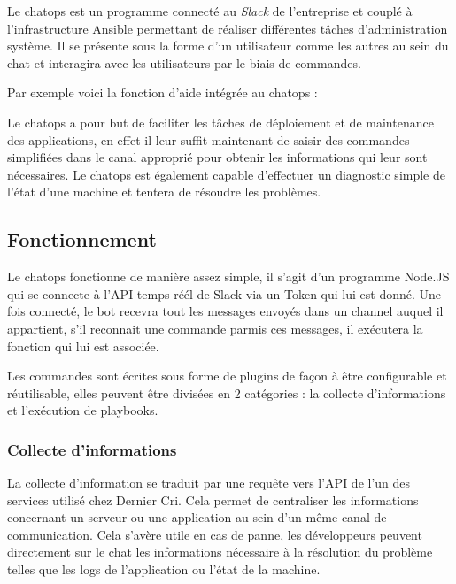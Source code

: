 \documentclass[12pt,a4paper]{article}
\begin{document}
  Le chatops est un programme connecté au \emph{Slack} de l'entreprise et
  couplé à l'infrastructure Ansible permettant de réaliser différentes
  tâches d'administration système. Il se présente sous la forme d'un
  utilisateur comme les autres au sein du chat et interagira avec les
  utilisateurs par le biais de commandes.

  \bigskip

  Par exemple voici la fonction d'aide intégrée au chatops :

  \bigskip

  Le chatops a pour but de faciliter les tâches de déploiement et de
  maintenance des applications, en effet il leur suffit maintenant de
  saisir des commandes simplifiées dans le canal approprié pour obtenir
  les informations qui leur sont nécessaires. Le chatops est également
  capable d'effectuer un diagnostic simple de l'état d'une machine et
  tentera de résoudre les problèmes.

  \newpage

  \subsection{Fonctionnement}\label{fonctionnement}

  Le chatops fonctionne de manière assez simple, il s'agit d'un programme
  Node.JS qui se connecte à l'API temps réél de Slack via un Token qui lui
  est donné. Une fois connecté, le bot recevra tout les messages envoyés
  dans un channel auquel il appartient, s'il reconnait une commande parmis
  ces messages, il exécutera la fonction qui lui est associée.

  \bigskip

  Les commandes sont écrites sous forme de plugins de façon à être
  configurable et réutilisable, elles peuvent être divisées en 2
  catégories : la collecte d'informations et l'exécution de playbooks.

  \newpage

  \subsubsection{Collecte d'informations}\label{collecte-dinformations}

  La collecte d'information se traduit par une requête vers l'API de l'un
  des services utilisé chez Dernier Cri. Cela permet de centraliser les
  informations concernant un serveur ou une application au sein d'un même
  canal de communication. Cela s'avère utile en cas de panne, les
  développeurs peuvent directement sur le chat les informations nécessaire
  à la résolution du problème telles que les logs de l'application ou
  l'état de la machine.
\end{document}
